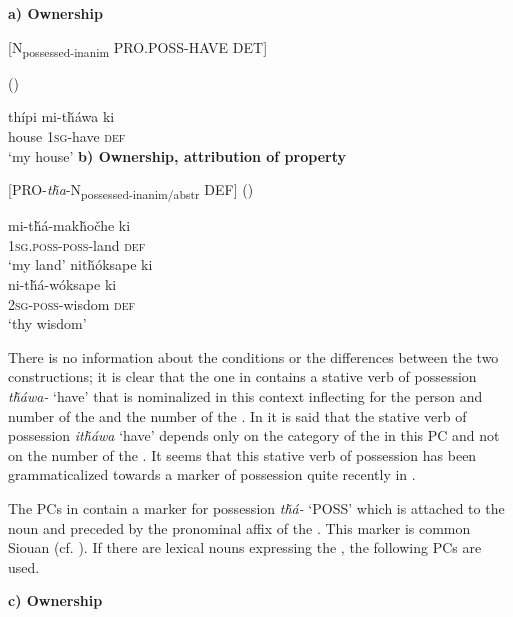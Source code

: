\documentclass[output=paper]{LSP/langsci}
\begin{document}
\vspace{1em}
\textbf{a)	Ownership}

[N\textsubscript{possessed-inanim} PRO.POSS-HAVE DET]
\vspace{1em}

\ea {} (\citealt[98]{Buechel1939}) \label{lakotahouse}

\gll thípi     mi-t\v{h}áwa ki \\
house \textsc{1sg}-have  \textsc{def} \\
\glt `my house'
\z
\vspace{1em}
\textbf{b) Ownership, attribution of property}

[PRO-\textit{t\v{h}a}-N\textsubscript{possessed-inanim/abstr} DEF]
\vspace{1em}
\ea {} (\citealt[98]{Buechel1939}) \label{lakotalandwisdom}

\ea \gll mi-t\v{h}á-mak\v{h}o\v{c}he   ki \\
\textsc{1sg.poss-poss}-land   \textsc{def} \\
\glt `my land'
\ex  
\glll nit\v{h}óksape ki \\
 ni-t\v{h}á-wóksape   ki \\
\textsc{2sg-poss}-wisdom  \textsc{def} \\
\glt `thy wisdom'
\z \z

There is no information about the conditions or the differences between the two constructions; it is clear that the one in  contains a stative verb of possession \textit{t\v{h}áwa-} `have' that is nominalized in this context inflecting for the person and number of the  and the number of the . In \citet[458]{RoodTaylor1996} it is said that the stative verb of possession \textit{it\v{h}áwa} `have' depends only on the category of the  in this PC and not on the number of the . It seems that this stative verb of possession has been grammaticalized towards a marker of possession quite recently in . 

The PCs in  contain a marker for possession \textit{t\v{h}á-} `POSS' which is attached to the  noun and preceded by the pronominal affix of the . This marker is common Siouan (cf. \citealt{RankinEtAl2015AccessMay}). If there are lexical nouns expressing the , the following PCs are used.

\vspace{1em}
\textbf{c)	Ownership}
\end{document}

